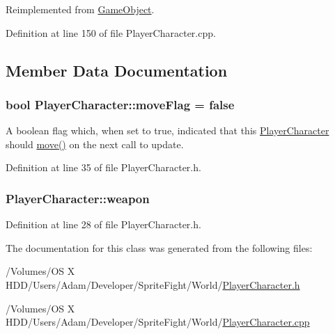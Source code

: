 Reimplemented from \hyperlink{class_game_object_adad7d284b670db722a2fda8e6a7997e3}{Game\-Object}.



Definition at line 150 of file Player\-Character.\-cpp.



\subsection{Member Data Documentation}
\hypertarget{class_player_character_a278a86804d9b5e8eddc66550f9fa82b6}{
\subsubsection[{move\-Flag}]{\setlength{\rightskip}{0pt plus 5cm}bool Player\-Character\-::move\-Flag = false\hspace{0.3cm}{\ttfamily [protected]}}}\label{class_player_character_a278a86804d9b5e8eddc66550f9fa82b6}


A boolean flag which, when set to true, indicated that this \hyperlink{class_player_character}{Player\-Character} should \hyperlink{class_game_object_aebf4e54c90de73d56186beaebead1ccc}{move()} on the next call to update. 



Definition at line 35 of file Player\-Character.\-h.

\hypertarget{class_player_character_aebf48777d82418e8aa2a01747a117621}{
\subsubsection[{weapon}]{ Player\-Character\-::weapon\hspace{0.3cm}{\ttfamily [protected]}}}\label{class_player_character_aebf48777d82418e8aa2a01747a117621}


Definition at line 28 of file Player\-Character.\-h.



The documentation for this class was generated from the following files\-:\begin{DoxyCompactItemize}
\item 
/\-Volumes/\-O\-S X H\-D\-D/\-Users/\-Adam/\-Developer/\-Sprite\-Fight/\-World/\hyperlink{_player_character_8h}{Player\-Character.\-h}\item 
/\-Volumes/\-O\-S X H\-D\-D/\-Users/\-Adam/\-Developer/\-Sprite\-Fight/\-World/\hyperlink{_player_character_8cpp}{Player\-Character.\-cpp}\end{DoxyCompactItemize}
